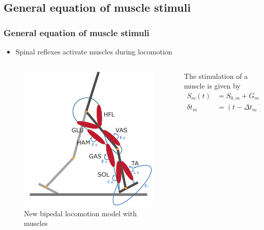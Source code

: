 \documentclass[10pt]{beamer}
\begin{document}
\subsection[Methodology]{General equation of muscle stimuli}
\begin{frame}
	\frametitle{General equation of muscle stimuli}
	\begin{itemize}
		\item Spinal reflexes activate muscles during locomotion
	\end{itemize}

	\begin{columns}
		\begin{column}{.5\textwidth}
			\begin{figure}
				\centering
				\includegraphics[height=.45\textheight]{images/new_model/stance/muscle_all.pdf}
				\caption{New bipedal locomotion model with muscles}	
			\end{figure}
		\end{column}
		\begin{column}{.5\textwidth}
			\begin{block}{}
				The stimulation of a muscle is given by
				\begin{align*}
					S_{m}(t)&=S_{0,m} + G_{m} F_{m} \delta t_m,  \\
					\delta t_m &= (t-\Delta t_{m}),
 				\end{align*}

\end{block}
\end{column}
\end{columns}
\end{frame}
\end{document}
